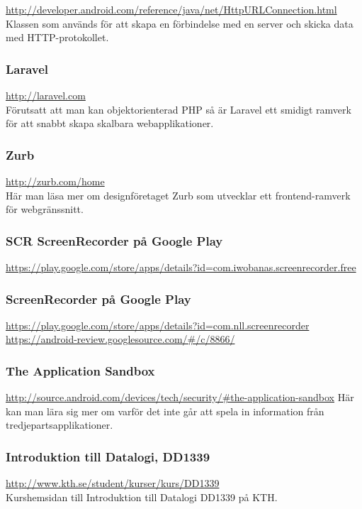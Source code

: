 \url{http://developer.android.com/reference/java/net/HttpURLConnection.html} \\
Klassen som används för att skapa en förbindelse med en server och skicka data med HTTP-protokollet.

\subsubsection{Laravel}
\url{http://laravel.com} \\
Förutsatt att man kan objektorienterad PHP så är Laravel ett smidigt ramverk för att snabbt skapa skalbara webapplikationer.

\subsubsection{Zurb}
\url{http://zurb.com/home} \\
Här man läsa mer om designföretaget Zurb som utvecklar ett frontend-ramverk för webgränssnitt.

\subsubsection{SCR ScreenRecorder på Google Play}
\url{https://play.google.com/store/apps/details?id=com.iwobanas.screenrecorder.free}

\subsubsection{ScreenRecorder på Google Play}
\url{https://play.google.com/store/apps/details?id=com.nll.screenrecorder}
\url{https://android-review.googlesource.com/\#/c/8866/}

\subsubsection{The Application Sandbox}
\url{http://source.android.com/devices/tech/security/\#the-application-sandbox}
Här kan man lära sig mer om varför det inte går att spela in information från tredjepartsapplikationer.

\subsubsection{Introduktion till Datalogi, DD1339}
\url{http://www.kth.se/student/kurser/kurs/DD1339} \\
Kurshemsidan till Introduktion till Datalogi DD1339 på KTH.

